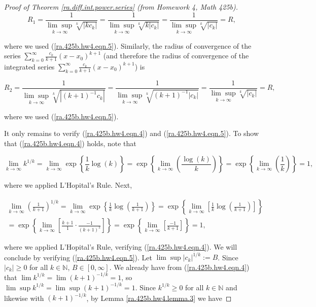 \begin{proof}[Proof of Theorem \ref{ra.diff.int.power.series} (from Homework 4, Math 425b)]


\[
R_1 = \frac{1}{\underset{k \to \infty}{\lim \sup} \sqrt[k]{|k c_k|}} = \frac{1}{\underset{k \to \infty}{\lim \sup} \sqrt[k]{k| c_k|}} = \frac{1}{\underset{k \to \infty}{\lim \sup} \sqrt[k]{|c_k|}} = R,
\]

where we used (\ref{ra.425b.hw4.eqn.5}). Similarly, the radius of convergence of the series \(\sum_{k=0}^{\infty} \frac{c_k}{k+1}(x-x_0)^{k+1}\) (and therefore the radius of convergence of the integrated series \(\sum_{k=0}^{\infty} \frac{c_k}{k+1}(x-x_0)^{k+1}\)) is 

\[
R_2 = \frac{1}{\underset{k \to \infty}{\lim \sup} \sqrt[k]{|(k+1)^{-1} c_k|}} = \frac{1}{\underset{k \to \infty}{\lim \sup} \sqrt[k]{(k+1)^{-1}| c_k|}} = \frac{1}{\underset{k \to \infty}{\lim \sup} \sqrt[k]{|c_k|}} = R,
\]

where we used (\ref{ra.425b.hw4.eqn.5}). 

It only remains to verify (\ref{ra.425b.hw4.eqn.4}) and (\ref{ra.425b.hw4.eqn.5}). To show that (\ref{ra.425b.hw4.eqn.4}) holds, note that 

\[
\lim_{k \to \infty} k^{1/k} = \lim_{k \to \infty}  \exp \left\{ \frac{1}{k} \log(k) \right\} =    \exp \left\{  \lim_{k \to \infty}  \left( \frac{\log(k)  }{k} \right) \right\}  =    \exp \left\{  \lim_{k \to \infty}  \left( \frac{1}{k}  \right) \right\} = 1,
\]

where we applied L'Hopital's Rule. Next,

\begin{multline*}
\lim_{k \to \infty} \left( \frac{1}{k+1} \right)^{1/k} = \lim_{k \to \infty}  \exp \left\{ \frac{1}{k} \log \left(  \frac{1}{k+1}\right) \right\} =  \exp \left\{ \lim_{k \to \infty}  \left[ \frac{1}{k} \log \left(  \frac{1}{k+1}\right) \right] \right\}  
\\ =  \exp \left\{ \lim_{k \to \infty}  \left[ \frac{k+1}{1}  \cdot \frac{-1}{(k+1)^2} \right] \right\} =  \exp \left\{ \lim_{k \to \infty}  \left[\frac{-1}{k+1} \right] \right\} =1,
\end{multline*}

where we applied L'Hopital's Rule, verifying (\ref{ra.425b.hw4.eqn.4}). We will conclude by verifying (\ref{ra.425b.hw4.eqn.5}). Let \(\lim \sup |c_k|^{1/k} := B\). Since \(|c_k| \geq 0\) for all \(k \in \mathbb{N}\), \(B \in [0, \infty]\). We already have from (\ref{ra.425b.hw4.eqn.4}) that \(\lim  k^{1/k} = \lim (k+1)^{-1/k} = 1\), so \(\lim \sup k^{1/k} = \lim \sup (k+1)^{-1/k} = 1\). Since \(k^{1/k} \geq 0\) for all \(k \in \mathbb{N}\) and likewise with \((k+1)^{-1/k} \), by Lemma \ref{ra.425b.hw4.lemma.3} we have 


\end{proof}
